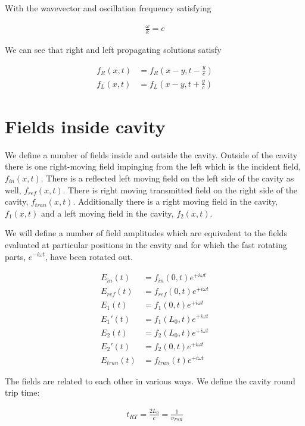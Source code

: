 \documentclass[12pt]{article}
\begin{document}
With the wavevector and oscillation frequency satisfying

\begin{align}
\frac{\omega}{k} = c
\end{align}

We can see that right and left propagating solutions satisfy

\begin{align}
f_R(x, t) &= f_R\left(x-y, t-\frac{y}{c}\right)\\
f_L(x, t) &= f_L\left(x-y, t+\frac{y}{c}\right)
\end{align}

\section{Fields inside cavity}
We define a number of fields inside and outside the cavity. Outside of the cavity there is one right-moving field impinging from the left which is the incident field, $f_{in}(x, t)$. 
There is a reflected left moving field on the left side of the cavity as well, $f_{ref}(x, t)$.
There is  right moving transmitted field on the right side of the cavity, $f_{tran}(x, t)$.
Additionally there is a right moving field in the cavity, $f_1(x, t)$ and a left moving field in the cavity, $f_2(x, t)$.

We will define a number of field amplitudes  which are equivalent to the fields evaluated at particular positions in the cavity and for which the fast rotating parts, $e^{-i\omega t}$, have been rotated out.

\begin{align}
E_{in}(t) &= f_{in}(0, t)e^{+i\omega t}\\
E_{ref}(t) &= f_{ref}(0, t)e^{+i\omega t}\\
E_1(t) &= f_1(0, t)e^{+i\omega t}\\
E_1'(t) &= f_1(L_0, t)e^{+i\omega t}\\
E_2(t) &= f_2(L_0, t)e^{+i\omega t}\\
E_2'(t) &= f_2(0, t)e^{+i\omega t}\\
E_{tran}(t) &= f_{tran}(t)e^{+i\omega t}
\end{align}

The fields are related to each other in various ways.
We define the cavity round trip time:

\begin{align}
t_{RT} = \frac{2L_0}{c} = \frac{1}{\nu_{FSR}}
\end{align}
\end{document}
